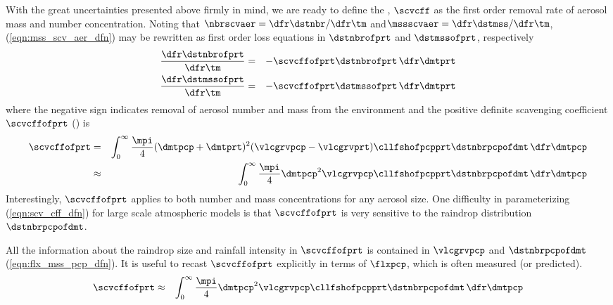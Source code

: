\documentclass[12pt,twoside]{book}
\begin{document}
With the great uncertainties presented above firmly in mind, we are
ready to define the , 
$\scvcff$ as the first order removal rate of aerosol mass and number
concentration.
Noting that $\nbrscvaer = \dfr\dstnbr/\dfr\tm$ and$\mssscvaer = \dfr\dstmss/\dfr\tm$,
(\ref{eqn:mss_scv_aer_dfn}) may be rewritten as first order loss
equations in $\dstnbrofprt$ and $\dstmssofprt$, respectively
\begin{eqnarray}
\label{eqn:dst_scv_nbr_dfn}
\frac{\dfr\dstnbrofprt}{\dfr\tm} & = & 
-\scvcffofprt \dstnbrofprt \,\dfr\dmtprt \\
\label{eqn:dst_scv_mss_dfn}
\frac{\dfr\dstmssofprt}{\dfr\tm} & = & 
-\scvcffofprt \dstmssofprt \,\dfr\dmtprt
\end{eqnarray}
where the negative sign indicates removal of aerosol number and mass
from the environment and the positive definite scavenging coefficient
$\scvcffofprt$ (\xs) is  
\begin{eqnarray}
\scvcffofprt & = &
\int_{0}^{\infty} \frac{\mpi}{4} 
( \dmtpcp + \dmtprt)^{2} ( \vlcgrvpcp - \vlcgrvprt )
\cllfshofpcpprt \dstnbrpcpofdmt \,\dfr\dmtpcp \\
& \approx &
\int_{0}^{\infty} \frac{\mpi}{4} 
\dmtpcp^{2} \vlcgrvpcp
\cllfshofpcpprt \dstnbrpcpofdmt \,\dfr\dmtpcp
\label{eqn:scv_cff_dfn}
\end{eqnarray}
Interestingly, $\scvcffofprt$ applies to both  
number and mass concentrations for any aerosol size.
One difficulty in parameterizing (\ref{eqn:scv_cff_dfn}) for large
scale atmospheric models is that $\scvcffofprt$ is very sensitive to
the raindrop distribution $\dstnbrpcpofdmt$.

All the information about the raindrop size and rainfall intensity
in $\scvcffofprt$ is contained in $\vlcgrvpcp$ and $\dstnbrpcpofdmt$ 
(\ref{eqn:flx_mss_pcp_dfn}). 
It is useful to recast $\scvcffofprt$ explicitly in terms of
$\flxpcp$, which is often measured (or predicted).
\begin{eqnarray}
\scvcffofprt & \approx &
\int_{0}^{\infty} \frac{\mpi}{4} 
\dmtpcp^{2} \vlcgrvpcp
\cllfshofpcpprt \dstnbrpcpofdmt \,\dfr\dmtpcp
\label{eqn:scv_cff_pcp_dfn}
\end{eqnarray}
\end{document}
